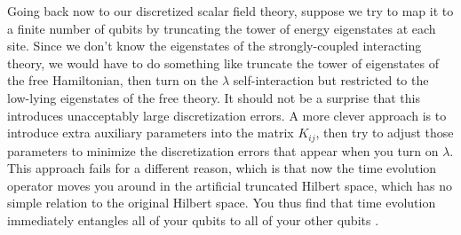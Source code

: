 \documentclass[a4paper,11pt]{article}
\begin{document}
Going back now to our discretized scalar field theory, suppose we try to map it to a finite number of qubits by truncating the tower of energy eigenstates at each
site. Since we don't know the eigenstates of the strongly-coupled interacting theory, we would have to do something like truncate the tower of eigenstates of the
free Hamiltonian, then turn on the $\lambda$ self-interaction but restricted to the low-lying eigenstates of the free theory. It should not be a surprise that this
introduces unacceptably large discretization errors. A more clever approach is to introduce extra auxiliary parameters into the matrix $K_{ij}$, then try
to adjust those parameters to minimize the discretization errors that appear when you turn on $\lambda$. This approach fails for a different reason,
which is that now the time evolution operator moves you around  in the artificial truncated Hilbert space, which has no simple relation to the original
Hilbert space. You thus find that time evolution immediately entangles all of your qubits to all of your other qubits \cite{Klco:2018zqz}.
\end{document}
